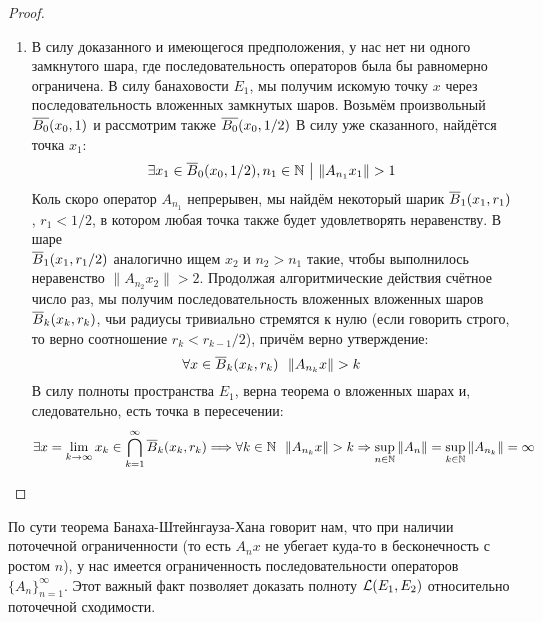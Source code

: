 \begin{proof}
\begin{enumerate}
		\item В силу доказанного и имеющегося предположения, у нас нет ни одного замкнутого шара, где последовательность операторов была бы равномерно ограничена. В силу банаховости $E_1$, мы получим искомую точку $x$ через последовательность вложенных замкнутых шаров. Возьмём произвольный $\overline{B_0}(x_0, 1)$ и рассмотрим также $\overline{B_0}(x_0, 1 / 2)$ В силу уже сказанного, найдётся точка $x_1$:
		\[
			\exists x_1 \in \overline{B}_0(x_0, 1 / 2), n_1 \in \mathbb{N} \ \big|\  \|A_{n_1}x_1\| > 1
		\]
		Коль скоро оператор $A_{n_1}$ непрерывен, мы найдём некоторый шарик $\overline{B}_1(x_1, r_1)$, $r_1 < 1 / 2$, в котором любая точка также будет удовлетворять неравенству. В шаре \\ $\overline{B}_1(x_1, r_1 / 2)$ аналогично ищем $x_2$ и $n_2 > n_1$ такие, чтобы выполнилось неравенство $\|A_{n_2}x_2\| > 2$. Продолжая алгоритмические действия счётное число раз, мы получим последовательность вложенных вложенных шаров $\overline{B}_k(x_k, r_k)$, чьи радиусы тривиально стремятся к нулю (если говорить строго, то верно соотношение $r_k < r_{k - 1} / 2$), причём верно утверждение:
		\[
			\forall x \in \overline{B}_k(x_k, r_k)\ \ \|A_{n_k}x\| > k
		\]
		В силу полноты пространства $E_1$, верна теорема о вложенных шарах и, следовательно, есть точка в пересечении:
		\[
			\exists x = \lim_{k \to \infty} x_k \in \bigcap_{k = 1}^\infty \overline{B}_k(x_k, r_k) \Longrightarrow \forall k \in \mathbb{N}\ \ \|A_{n_k}x\| > k \Rightarrow \sup_{n \in \mathbb{N}} \|A_n\| = \sup_{k \in \mathbb{N}} \|A_{n_k}\| = \infty
		\]
	\end{enumerate}
\end{proof}

\begin{anote}
	По сути теорема Банаха-Штейнгауза-Хана говорит нам, что при наличии поточечной ограниченности (то есть $A_nx$ не убегает куда-то в бесконечность с ростом $n$), у нас имеется ограниченность последовательности операторов $\{A_n\}_{n = 1}^\infty$. Этот важный факт позволяет доказать полноту $\mathcal{L}(E_1, E_2)$ относительно поточечной сходимости.
\end{anote}

